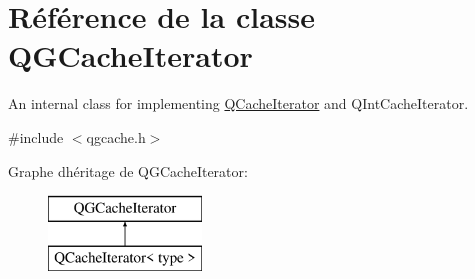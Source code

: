 \hypertarget{class_q_g_cache_iterator}{}\section{Référence de la classe Q\+G\+Cache\+Iterator}
\label{class_q_g_cache_iterator}


An internal class for implementing \hyperlink{class_q_cache_iterator}{Q\+Cache\+Iterator} and Q\+Int\+Cache\+Iterator.  




{\ttfamily \#include $<$qgcache.\+h$>$}

Graphe d\textquotesingle{}héritage de Q\+G\+Cache\+Iterator\+:\begin{figure}[H]
\begin{center}
\leavevmode
\includegraphics[height=2.000000cm]{class_q_g_cache_iterator}
\end{center}
\end{figure}
